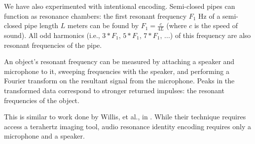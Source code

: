 We have also experimented with intentional encoding.  Semi-closed pipes can function as resonance chambers: the first resonant frequency $F_1$ Hz of a semi-closed pipe length $L$ meters can be found by $F_1 = \frac{c}{4L}$ (where $c$ is the speed of sound).  All odd harmonics (i.e., $3*F_1$, $5*F_1$, $7*F_1$, ...) of this frequency are also resonant frequencies of the pipe. 

An object's resonant frequency can be measured by attaching a speaker and microphone to it, sweeping frequencies with the speaker, and performing a Fourier transform on the resultant signal from the microphone.  Peaks in the transformed data correspond to stronger returned impulses: the resonant frequencies of the object.

This is similar to work done by Willis, et al., in \cite{Willis-infrastructs}.  While their technique requires access a terahertz imaging tool, audio resonance identity encoding requires only a microphone and a speaker.


